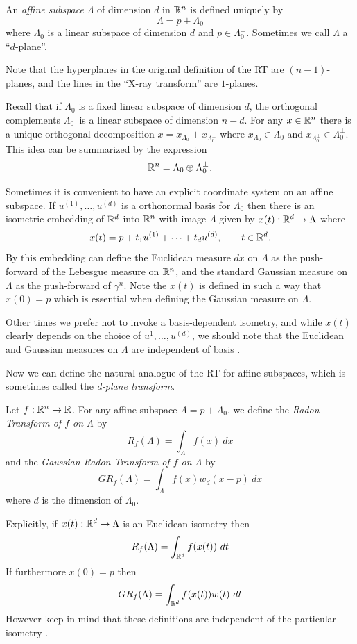 \begin{definition}
  An \emph{affine subspace} $\Lambda$ of dimension $d$ in $\mathbb{R}^n$ is defined uniquely by
  \[
    \Lambda = p + \Lambda_0
  \]
  where $\Lambda_0$ is a linear subspace of dimension $d$ and $p \in \Lambda_0^\perp$. Sometimes we call $\Lambda$ a ``$d$-plane''.
\end{definition}

\begin{remark}
  Note that the hyperplanes in the original definition of the RT are $(n-1)$-planes, and the lines in the ``X-ray transform'' are $1$-planes.
\end{remark}

Recall that if $\Lambda_0$ is a fixed linear subspace of dimension $d$, the orthogonal complements $\Lambda_0^\perp$ is a linear subspace of dimension $n - d$. For any $x \in \mathbb{R}^n$ there is a unique orthogonal decomposition $x = x_{\Lambda_0} + x_{\Lambda_0^\perp}$ where $x_{\Lambda_0} \in \Lambda_0$ and $x_{\Lambda_0^\perp} \in \Lambda_0^\perp$. This idea can be summarized by the expression
\[
  \mathbb{R}^n = \Lambda_0 \oplus \Lambda_0^\perp.
\]

Sometimes it is convenient to have an explicit coordinate system on an affine subspace. If $u^{(1)}, \ldots, u^{(d)}$ is a orthonormal basis for $\Lambda_0$ then there is an isometric embedding of $\mathbb{R}^d$ into $\mathbb{R}^n$ with image $\Lambda$ given by $x(t) : \mathbb{R}^d \rightarrow \Lambda$ where
\[
  x(t) = p + t_1u^{(1)} + \cdots + t_d u^{(d)}, \qquad t \in \mathbb{R}^d.
\]
By this embedding can define the Euclidean measure $dx$ on $\Lambda$ as the push-forward of the Lebesgue measure on $\mathbb{R}^n$, and the standard Gaussian measure on $\Lambda$ as the push-forward of $\gamma^n$. Note the $x(t)$ is defined in such a way that $x(0) = p$ which is essential when defining the Gaussian measure on $\Lambda$.

Other times we prefer not to invoke a basis-dependent isometry, and while $x(t)$ clearly depends on the choice of $u^{1}, \ldots, u^{(d)}$, we should note that the Euclidean and Gaussian measures on $\Lambda$ are independent of basis \pn.


Now we can define the natural analogue of the RT for affine subspaces, which is sometimes called the \emph{d-plane transform}.

\begin{definition}
  Let $f:\mathbb{R}^n \rightarrow \mathbb{R}$. For any affine subspace $\Lambda = p + \Lambda_0$, we define the \emph{Radon Transform of $f$ on $\Lambda$} by
  \[
    R_f(\Lambda) = \int_{\Lambda} f(x)~dx
  \]
  and the \emph{Gaussian Radon Transform of $f$ on $\Lambda$} by 
  \[
    GR_f(\Lambda) = \int_{\Lambda} f(x) w_d(x - p) ~dx
  \]
  where $d$ is the dimension of $\Lambda_0$.
\end{definition}
\begin{remark}
  Explicitly, if $x(t): \mathbb{R}^d \rightarrow \Lambda$ is an Euclidean isometry then 
  \[
    R_f(\Lambda) = \int_{\mathbb{R}^d} f(x(t))~dt
  \]
  If furthermore $x(0) = p$ then
  \[
    GR_f(\Lambda) = \int_{\mathbb{R}^d} f(x(t))w(t)~dt
  \]
  However keep in mind that these definitions are independent of the particular isometry \pn.
\end{remark}

